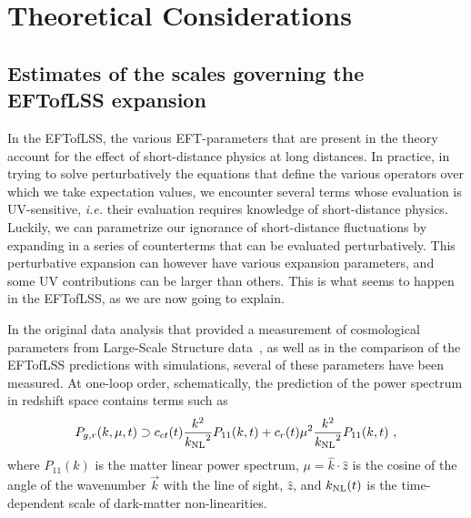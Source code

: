 \documentclass[12pt,a4paper]{article}
\renewcommand{\(}{\left(}
\renewcommand{\)}{\right)}
\def\be{\begin{equation}}
\def\ee{\end{equation}}
\def\knl{{k_{\rm NL}}}
\begin{document}
\section{Theoretical Considerations}

\subsection{Estimates of the scales governing the EFTofLSS expansion}

In the EFTofLSS, the various EFT-parameters that are present in the theory account for the effect of short-distance physics at long distances. In practice, in trying to solve perturbatively the equations that define the various operators over which we take expectation values, we encounter several terms whose evaluation is UV-sensitive, {\it i.e.} their evaluation requires knowledge of short-distance physics. Luckily, we can parametrize our ignorance of short-distance fluctuations by expanding in a series of counterterms that can be evaluated perturbatively. This perturbative expansion can however have various expansion parameters, and some UV contributions can be larger than others. This is what seems to happen in the EFTofLSS, as we are now going to explain.

In the original data analysis that provided a measurement of cosmological parameters from Large-Scale Structure data~\cite{DAmico:2019fhj,Colas:2019ret}, as well as in {the comparison of} the EFTofLSS predictions with simulations, several of these parameters have been measured. At one-loop order, schematically, the prediction of the power spectrum in redshift space contains terms such as
\be
P_{g,r}(k,\mu,t)\supset c_{ct}(t) \frac{k^2}{\knl^2} P_{11}(k,t)+c_{r}(t) \mu^2\frac{k^2}{\knl^2} P_{11}(k,t)\ ,
\ee
where $P_{11}(k)$ is the matter linear power spectrum, {$\mu = \hat{k} \cdot \hat{z}$} is the {cosine of the} angle of the wavenumber $\vec k$ with the line of sight, $\hat z$, and $\knl(t)$ is the time-dependent scale of dark-matter non-linearities. 
\end{document}
